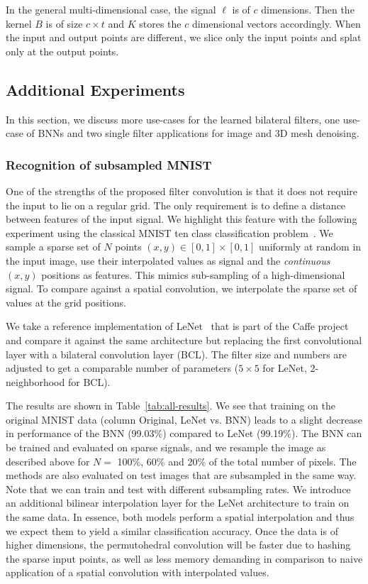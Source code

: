 In the general multi-dimensional case, the signal $\ell$ is of $c$ dimensions. Then
the kernel $B$ is of size $c \times t$ and $K$ stores the $c$ dimensional vectors
accordingly. When the input and output points are different, we slice only the
input points and splat only at the output points.


\subsection{Additional Experiments}
\label{sec:addexps}
In this section, we discuss more use-cases for the learned bilateral filters, one
use-case of BNNs and two single filter applications for image and 3D mesh denoising.

\subsubsection{Recognition of subsampled MNIST}\label{sec:app_mnist}

One of the strengths of the proposed filter convolution is that it does not
require the input to lie on a regular grid. The only requirement is to define a distance
between features of the input signal.
We highlight this feature with the following experiment using the
classical MNIST ten class classification problem~\cite{lecun1998mnist}. We sample a
sparse set of $N$ points $(x,y)\in [0,1]\times [0,1]$
uniformly at random in the input image, use their interpolated values
as signal and the \emph{continuous} $(x,y)$ positions as features. This mimics
sub-sampling of a high-dimensional signal. To compare against a spatial convolution,
we interpolate the sparse set of values at the grid positions.

We take a reference implementation of LeNet~\cite{lecun1998gradient} that
is part of the Caffe project~\cite{jia2014caffe} and compare it
against the same architecture but replacing the first convolutional
layer with a bilateral convolution layer (BCL). The filter size
and numbers are adjusted to get a comparable number of parameters
($5\times 5$ for LeNet, $2$-neighborhood for BCL).

The results are shown in Table~\ref{tab:all-results}. We see that training
on the original MNIST data (column Original, LeNet vs. BNN) leads to a slight
decrease in performance of the BNN (99.03\%) compared to LeNet
(99.19\%). The BNN can be trained and evaluated on sparse
signals, and we resample the image as described above for $N=$ 100\%, 60\% and
20\% of the total number of pixels. The methods are also evaluated
on test images that are subsampled in the same way. Note that we can
train and test with different subsampling rates. We introduce an additional
bilinear interpolation layer for the LeNet architecture to train on the same
data. In essence, both models perform a spatial interpolation and thus we
expect them to yield a similar classification accuracy. Once the data is of
higher dimensions, the permutohedral convolution will be faster due to hashing
the sparse input points, as well as less memory demanding in comparison to
naive application of a spatial convolution with interpolated values.

